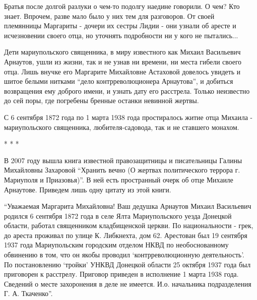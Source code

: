 Братья после долгой разлуки о чем-то подолгу наедине говорили. О чем? Кто
знает. Впрочем, разве мало было у них тем для разговоров. От своей племянницы
Маргариты - дочери их сестры Лидии - они узнали об аресте и исчезновении
своего отца, но уточнять подробности ни у кого не пытались...

Дети мариупольского священника, в миру известного как Михаил Васильевич
Арнаутов, ушли из жизни, так и не узнав ни времени, ни места гибели своего
отца. Лишь внучке его Маргарите Михайловне Астаховой довелось увидеть и шитое
белыми нитками \enquote{дело контрреволюционера Арнаутова}, и добиться возвращения ему
доб­рого имени, и узнать дату его расстрела. Только неизвестно до сей поры,
где погребены бренные останки невинной жертвы.

С 6 сентября 1872 года по 1 марта 1938 года простиралось житие отца Михаила -
мариупольского священника, любителя-садовода, так и не ставшего монахом.

*  *  *

В 2007 году вышла книга известной правозащитницы и писательницы Галины
Михайловны Захаровой \enquote{Хранить вечно (О жертвах политического террора г.
Мариуполя и Приазовья)}. В ней есть пространный очерк об отце Михаиле
Арнаутове. Приведем лишь одну цитату из этой книги.

\enquote{Уважаемая Маргарита Михайловна! Ваш дедушка Арнаутов Михаил Василье­вич
родился 6 сентября 1872 года в селе Ялта Мариупольского уезда Донецкой
области, работал священником кладбищенской церкви. По национальности - грек,
до ареста проживал по улице К. Либкнехта, дом 62. Арестован был 19 сентября
1937 года Мариупольским городским отделом НКВД по необоснованному обвинению в
том, что он якобы проводил \enquote{контрреволюционную деятельность}. По постановлению
\enquote{тройки} УНКВД Донецкой области 25 октября 1937 года был приговорен к
расстрелу. Приговор приведен в исполнение 1 марта 1938 года. Сведений о месте
захоронения в деле не имеется. И.о. начальника подразделения Г. А. Ткаченко}.
